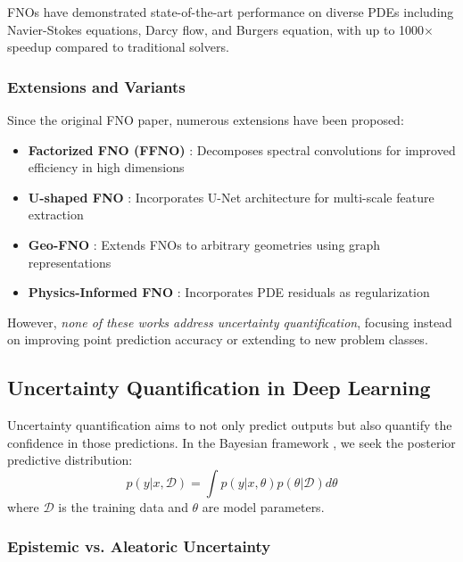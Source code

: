 FNOs have demonstrated state-of-the-art performance on diverse PDEs including Navier-Stokes equations, Darcy flow, and Burgers equation, with up to 1000$\times$ speedup compared to traditional solvers.

\subsubsection{Extensions and Variants}

Since the original FNO paper, numerous extensions have been proposed:
\begin{itemize}
    \item \textbf{Factorized FNO (FFNO)} \cite{tran2021factorized}: Decomposes spectral convolutions for improved efficiency in high dimensions
    \item \textbf{U-shaped FNO} \cite{wen2022u}: Incorporates U-Net architecture for multi-scale feature extraction
    \item \textbf{Geo-FNO} \cite{li2022fourier}: Extends FNOs to arbitrary geometries using graph representations
    \item \textbf{Physics-Informed FNO} \cite{wang2021learning}: Incorporates PDE residuals as regularization
\end{itemize}

However, \emph{none of these works address uncertainty quantification}, focusing instead on improving point prediction accuracy or extending to new problem classes.

\subsection{Uncertainty Quantification in Deep Learning}

Uncertainty quantification aims to not only predict outputs but also quantify the confidence in those predictions. In the Bayesian framework \cite{bishop2006pattern,murphy2012machine}, we seek the posterior predictive distribution:
\begin{equation}
    p(y | x, \mathcal{D}) = \int p(y | x, \theta) p(\theta | \mathcal{D}) d\theta
\end{equation}
where $\mathcal{D}$ is the training data and $\theta$ are model parameters.

\subsubsection{Epistemic vs. Aleatoric Uncertainty}

